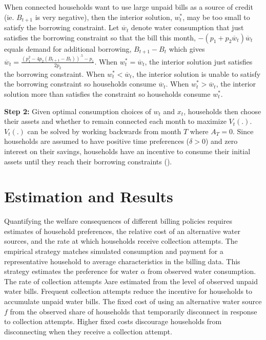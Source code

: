 \documentclass[12pt]{article}
\begin{document}
When connected households want to use large unpaid bills as a source of credit (ie. $B_{t+1}$ is very negative), then the  interior solution, $w_t^{*}$, may be too small to satisfy the borrowing constraint.  Let $\overline{w}_t$ denote water consumption that just satisfies the borrowing constraint so that the bill this month, $-(p_1 +p_2\overline{w}_t)\overline{w}_t$ equals demand for additional borrowing, $B_{t+1}-B_{t}$ which gives $\overline{w}_t = \frac{(p_1^2 - 4p_2 (B_{t+1}-B_{t}))^{.5} - p_1}{2 p_2}$.  When $w_t^{*}=\overline{w}_t$, the interior solution just satisfies the borrowing constraint.  When $w_t^{*}<\overline{w}_t$, the interior solution is unable to satisfy the borrowing constraint so households consume $\overline{w}_t$.  When $w_t^{*}>\overline{w}_t$, the  interior solution more than satisfies the constraint so households consume $w_t^{*}$.

\textbf{Step 2:}  Given optimal consumption choices of $w_t$ and $x_t$, households then choose their assets and whether to remain connected each month to maximize $V_t(.)$.  $V_t(.)$ can be solved by working backwards from month $T$ where $A_T = 0$.  Since households are assumed to have positive time preferences ($\delta>0$) and zero interest on their savings, households have an incentive to consume their initial assets until they reach their borrowing constraints (\cite{deaton1991saving}).  






\section{Estimation and Results}\label{section:estimation}    %



Quantifying the welfare consequences of different billing policies requires estimates of household preferences, the relative cost of an alternative water sources, and the rate at which households receive collection attempts.  The empirical strategy matches simulated consumption and payment for a representative household to average characteristics in the billing data.  This strategy estimates the preference for water $\alpha$ from observed water consumption.  The rate of collection attempts $\lambda$are estimated from the level of observed unpaid water bills.  Frequent collection attempts reduce the incentive for households to accumulate unpaid water bills.  The fixed cost of using an alternative water source $f$ from the observed share of households that temporarily disconnect in response to collection attempts.  Higher fixed costs discourage households from disconnecting when they receive a collection attempt.
\end{document}
